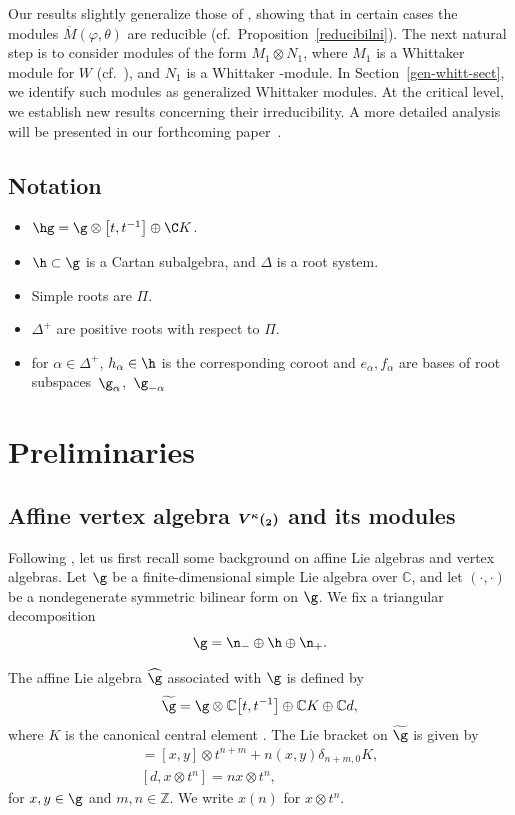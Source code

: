 \documentclass[10pt,a4paper]{amsart}
\numberwithin{equation}{section}
\theoremstyle{definition}
\newcommand{\1}{\textbf{1}}
\begin{document}
Our results slightly generalize those of \cite{FGXZ}, showing that in certain cases the modules $\overline{M}(\varphi, \theta)$ are reducible
(cf.~Proposition~\ref{reducibilni}).
The next natural step is to consider modules of the form $M_1 \otimes N_1$, where $M_1$ is a Whittaker module for $W$ (cf.~\cite{ALPY}), and $N_1$ is a Whittaker -module. In Section~\ref{gen-whitt-sect}, we identify such modules as generalized Whittaker modules. At the critical level, we establish new results concerning their irreducibility. A more detailed analysis will be presented in our forthcoming paper~\cite{AP-2026}.

\subsection*{Notation}
\begin{itemize}\itemsep=0pt
 \item $\hg = \g\otimes \bigl[t, t^{-1}\bigr]\oplus \C K$.
 \item $\h\subset \g$ is a Cartan subalgebra, and $\Delta$ is a root system.
 \item Simple roots are $\Pi$.
 \item $\Delta^+$ are positive roots with respect to $\Pi$.
 \item for $\alpha \in \Delta^+$, $h_{\alpha}\in \h$ is the corresponding coroot and $e_{\alpha}, f_{\alpha}$ are bases of root subspaces~$\g_{\alpha}$,~$\g_{-\alpha}$
\end{itemize}

\section{Preliminaries}\label{preliminaries}

\subsection[Affine vertex algebra V\^{}kappa(sl\_2) and its modules]{Affine vertex algebra $\boldsymbol{V^{\kappa}(\sl_2)}$ and its modules}

Following \cite{FB,K2,LL}, let us first recall some background on affine Lie algebras and vertex algebras.
Let ${\g}$ be a finite-dimensional simple Lie algebra over $\mathbb{C}$, and let $(\cdot,\cdot)$ be a nondegenerate symmetric bilinear form on ${\g}$.
We fix a triangular decomposition
\[
 {\g} = {\n}_{-} \oplus {\h} \oplus {\n}_{+}.
\]

The affine Lie algebra $\widehat{\g}$ associated with ${\g}$ is defined by
\[
 \widetilde{\g} = {\g} \otimes \mathbb{C}\bigl[t,t^{-1}\bigr] \oplus \mathbb{C}K \oplus \mathbb{C}d,
\]
where $K$ is the canonical central element \cite{K}.
The Lie bracket on $\widetilde{\g}$ is given by
\begin{gather*}
 [x \otimes t^n, y \otimes t^m] = [x,y] \otimes t^{n+m} + n (x,y) \delta_{n+m,0} K, \\ %
 [d, x \otimes t^n] = n x \otimes t^n,  %
\end{gather*}
for $x,y \in {\g}$ and $m,n \in \mathbb{Z}$.
We write $x(n)$ for $x \otimes t^n$.
\end{document}
